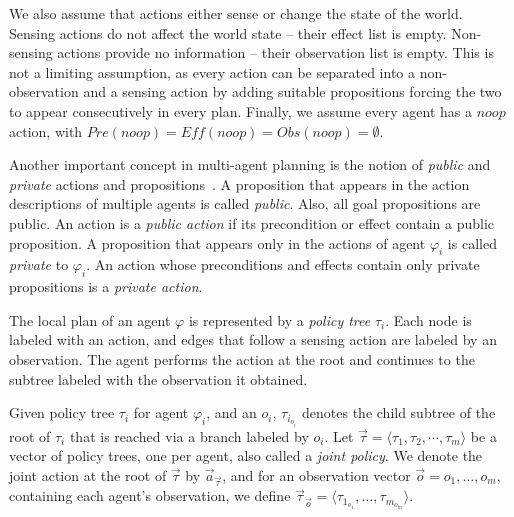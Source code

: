 \documentclass[letterpaper]{article} %
\theoremstyle{definition}
\begin{document}
We also assume that actions either sense or change the state of the world. Sensing actions do not affect the world state --  their effect list is empty.  Non-sensing actions provide 
no information -- their observation list is empty. This is not a limiting assumption, as every action can be separated into a non-observation and a sensing action by adding suitable propositions forcing the two to appear consecutively in every plan. Finally, we assume every agent has a $noop$ action, with $\mathit{Pre}(noop)=\mathit{Eff}(noop) =\mathit{Obs}(noop)= \emptyset$.


Another important concept in multi-agent planning is the notion of {\em public} and {\em private} actions and propositions~\citep{brafman2008one}. 
A proposition that appears in the action descriptions of multiple agents is called {\em public}. Also, all goal propositions are public.
An action is a {\em public action} if its precondition or effect contain a public proposition.
A proposition that appears only in the actions of agent $\varphi_i$ is called {\em private} to  $\varphi_i$. An action whose preconditions and effects contain only private propositions is a {\em private action}.




The local plan of an agent $\varphi$ is represented by a \emph{policy tree} $\tau_i$.  Each node is labeled with an action, and edges that follow a sensing action are labeled by an observation.  The agent performs the action at the root and continues to the subtree labeled with the observation it obtained.

Given policy tree $\tau_i$ for agent $\varphi_i$, and an $o_i$, $\tau_{i_{o_i}}$ denotes the child subtree of the root of $\tau_i$ that is reached via a branch labeled by $o_i$.
Let $\vec{\tau} = \langle  \tau_1, \tau_2, \cdots, \tau_m \rangle$ be a vector of policy trees, one per agent, 
also called a {\em joint policy}.
We denote the joint action at the root of $\vec{\tau}$ by $\vec{a}_{\vec{\tau}}$, and for an observation vector
$\vec{o}=o_1,\ldots, o_m$, containing each agent's observation, we define $\vec{\tau}_{\vec{o}}= \langle  \tau_{1_{o_1}},\ldots, \tau_{m_{o_m}}\rangle$.
\end{document}
